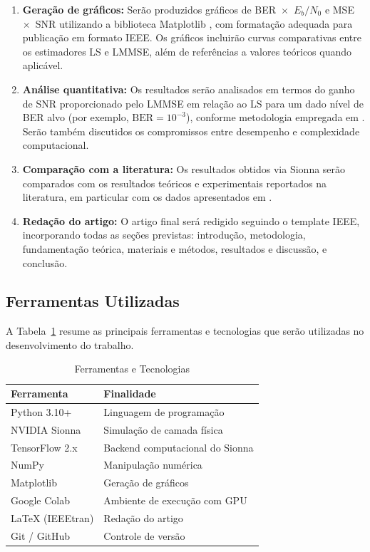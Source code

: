 \documentclass[conference]{IEEEtran}
\begin{document}
\begin{enumerate}
    \item \textbf{Geração de gráficos:} Serão produzidos gráficos de BER~$\times$~$E_b/N_0$ e MSE~$\times$~SNR utilizando a biblioteca Matplotlib \cite{matplotlib}, com formatação adequada para publicação em formato IEEE. Os gráficos incluirão curvas comparativas entre os estimadores LS e LMMSE, além de referências a valores teóricos quando aplicável.

    \item \textbf{Análise quantitativa:} Os resultados serão analisados em termos do ganho de SNR proporcionado pelo LMMSE em relação ao LS para um dado nível de BER alvo (por exemplo, $\text{BER} = 10^{-3}$), conforme metodologia empregada em \cite{edfors1998}. Serão também discutidos os compromissos entre desempenho e complexidade computacional.

    \item \textbf{Comparação com a literatura:} Os resultados obtidos via Sionna serão comparados com os resultados teóricos e experimentais reportados na literatura, em particular com os dados apresentados em \cite{vanDeBeek1995, edfors1998, hsieh1998}.

    \item \textbf{Redação do artigo:} O artigo final será redigido seguindo o template IEEE, incorporando todas as seções previstas: introdução, metodologia, fundamentação teórica, materiais e métodos, resultados e discussão, e conclusão.
\end{enumerate}

\subsection{Ferramentas Utilizadas}

A Tabela~\ref{tab:ferramentas} resume as principais ferramentas e tecnologias que serão utilizadas no desenvolvimento do trabalho.

\begin{table}[htbp]
\centering
\caption{Ferramentas e Tecnologias}
\label{tab:ferramentas}
\begin{tabular}{@{}ll@{}}
\toprule
\textbf{Ferramenta} & \textbf{Finalidade} \\
\midrule
Python 3.10+ & Linguagem de programação \\
NVIDIA Sionna & Simulação de camada física \\
TensorFlow 2.x & Backend computacional do Sionna \\
NumPy & Manipulação numérica \\
Matplotlib & Geração de gráficos \\
Google Colab & Ambiente de execução com GPU \\
\LaTeX{} (IEEEtran) & Redação do artigo \\
Git / GitHub & Controle de versão \\
\bottomrule
\end{tabular}
\end{table}
\end{document}
